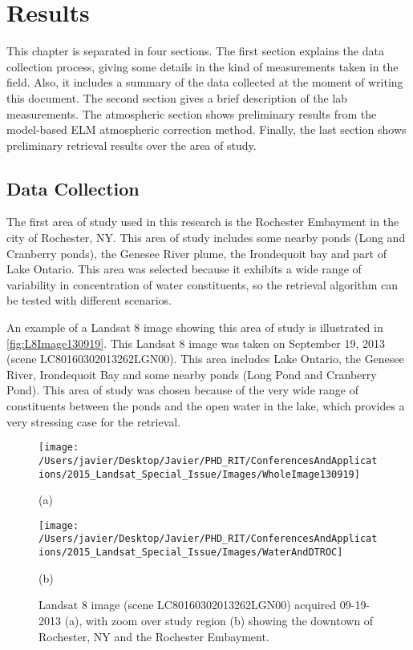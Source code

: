 \chapter{Results}
\label{ch:results}

This chapter is separated in four sections. The first section explains the data collection process, giving some details in the kind of measurements taken in the field. Also, it includes a summary of the data collected at the moment of writing this document. The second section gives a brief description of the lab measurements. The atmospheric section shows preliminary results from the model-based ELM atmospheric correction method. Finally, the last section shows preliminary retrieval results over the area of study.
\section{Data Collection}

The first area of study used in this research is the Rochester Embayment in the city of Rochester, NY. This area of study includes some nearby ponds (Long and Cranberry ponds), the Genesee River plume, the Irondequoit bay and part of Lake Ontario. This area was selected because it exhibits a wide range of variability in concentration of water constituents, so the retrieval algorithm can be tested with different scenarios. 

An example of a Landsat 8 image showing this area of study is illustrated in \autoref{fig:L8Image130919}. This Landsat 8 image was taken on September 19, 2013 (scene LC80160302013262LGN00). This area includes Lake Ontario, the Genesee River, Irondequoit Bay and some nearby ponds (Long Pond and Cranberry Pond). This area of study was chosen because of the very wide range of constituents between the ponds and the open water in the lake, which provides a very stressing case for the retrieval.


\begin{figure}[htbp!]
    \begin{minipage}[c]{0.48\linewidth}
      \centering
      \texttt{[image: /Users/javier/Desktop/Javier/PHD\_RIT/ConferencesAndApplications/2015\_Landsat\_Special\_Issue/Images/WholeImage130919]}
      \centerline{(a)}\medskip
    \end{minipage}
    \hfill
    \begin{minipage}[d]{0.48\linewidth}
      \centering
      \texttt{[image: /Users/javier/Desktop/Javier/PHD\_RIT/ConferencesAndApplications/2015\_Landsat\_Special\_Issue/Images/WaterAndDTROC]}
      \centerline{(b)}\medskip
    \end{minipage}  

    \caption{Landsat 8 image (scene LC80160302013262LGN00) acquired 09-19-2013 (a), with zoom over study region (b) showing the downtown of Rochester, NY and the Rochester Embayment. \label{fig:L8Image130919} }
\end{figure}


